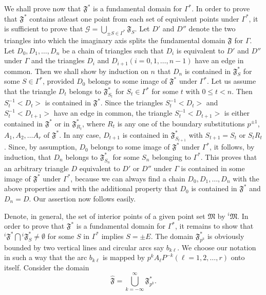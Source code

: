 We shall prove now that $\mathfrak{F}^{\ast}$ is a fundamental domain
for $\Gamma^{\ast}$. In order to prove that $\mathfrak{F}^{\ast}$
contains atleast one point from each set of equivalent points under
$\Gamma^{\ast}$, it is sufficient to prove that $\mathscr{G} =
\bigcup_{\pm S \in \Gamma^{\ast}} \mathfrak{F}_S$. Let $D'$
and $D''$ denote the two triangles into which the imaginary axis
splits the fundamental domain $\mathfrak{F}$ for $\Gamma$. Let
$D_0,D_1, \ldots, D_n$ be a chain of triangles such that $D_i$ is
equivalent to $D'$ and $D''$ under $\Gamma$ and the triangles $D_i$
and $D_{i+1}(i=0,1,\ldots, n-1)$ have an edge in common. Then we shall
show by induction on $n$ that $D_n$ is contained in
$\mathfrak{F}^{\ast}_S$ for some $S \in \Gamma^{\ast}$,
provided $D_0$ belongs to some image of $\mathfrak{F}^{\ast}$ under
$\Gamma^{\ast}$. Let us assume that the triangle $D_t$ belongs to
$\mathfrak{F}^{\ast}_{S_t}$ for $S_t \in \Gamma^{\ast}$ 
for \pageoriginale some $t$ with $0\leq t<n$. Then $S^{-1}_t<D_t>$ is
contained in $\mathfrak{F}^{\ast}$. Since the triangles
$S^{-1}_t<D_t>$ and $S^{-1}_t<D_{t+1}>$ have an edge in common, the
triangle $S^{-1}_t<D_{t+1}>$ is either contained in
$\mathfrak{F}^{\ast}$ or in $\mathfrak{F}^{\ast}_{R_t}$, where $R_t$
is any one of the boundary substitutions $p^{\pm 1}$, $A_1, A_2,
\ldots A_r$ of $\mathfrak{F}^{\ast}$. In any case, $D_{t+1}$ is
contained in $\mathfrak{F}^{\ast}_{S_{t+1}}$ with $S_{t+1}=S_t$ or
$S_t R_t$. Since, by assumption, $D_0$ belongs to some image of
$\mathfrak{F}^{\ast}$ under $\Gamma^{\ast}$, it follows, by induction,
that $D_n$ belongs to $\mathfrak{F}^{\ast}_{S_n}$ for some $S_n$
belonging to $\Gamma^{\ast}$. This proves that an arbitrary triangle
$D$ equivalent to $D'$ or $D''$ under $\Gamma$ is contained in some
image of $\mathfrak{F}^{\ast}$ under $\Gamma^{\ast}$, because we can
always find a chain $D_0, D_1, \ldots, D_n$ with the above properties
and with the additional property that $D_0$ is contained in
$\mathfrak{F}^{\ast}$ and $D_n=D$. Our assertion now follows easily. 

Denote, in general, the set of interior points of a given point set
$\mathfrak{M}$ by ${}^i\mathfrak{M}$. In order to prove that
$\mathfrak{F}^{\ast}$ is a fundamental domain for $\Gamma^{\ast}$, it
remains to show that ${}^i\mathfrak{F}^{\ast}\bigcap
{}^i\mathfrak{F}^{\ast}_S \neq \emptyset$ for some $S$ in
$\Gamma^{\ast}$ implies $S=\pm E$. The domain
$\mathfrak{F}^{\ast}_{p^k}$ is obviously bounded by two vertical lines
and circular arcs say $b_{k\ell}$. We choose our notation in such a
way that the arc $b_{k\ell}$ is mapped by $p^k A_{\ell} P^{-k}
(\ell=1,2,\ldots, r)$ onto itself. Consider the domain 
$$
\hat{\mathfrak{F}} = \bigcup^{\infty}_{k=-\infty} 
\mathfrak{F}^{\ast}_{p^k}. 
$$


